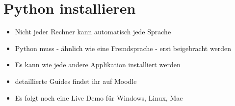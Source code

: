 \section{Python installieren}
\begin{frame}
    \slidehead
    \begin{itemize}[<+->]
        \item Nicht jeder Rechner kann automatisch jede Sprache
        \item Python muss - ähnlich wie eine Fremdsprache - erst beigebracht werden
        \item Es kann wie jede andere Applikation installiert werden
        \item detaillierte Guides findet ihr auf Moodle
        \item Es folgt noch eine Live Demo für Windows, Linux, Mac
    \end{itemize}
\end{frame}

\livecoding


